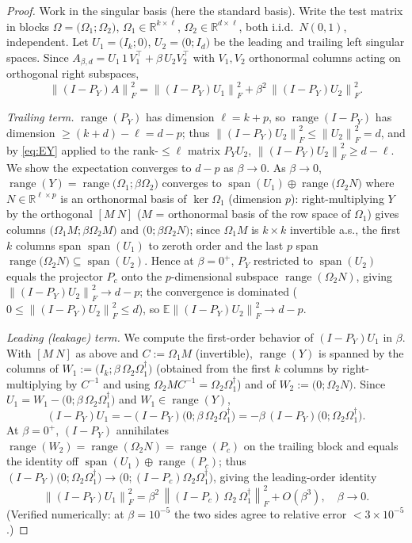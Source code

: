 \documentclass{amsart}
\theoremstyle{definition}
\DeclareMathOperator{\range}{range}
\DeclareMathOperator{\spann}{span}
\newcommand{\R}{\mathbb{R}}
\newcommand{\Frob}[1]{\left\lVert #1\right\rVert_F}
\newcommand{\E}{\mathbb{E}}
\begin{document}
\begin{proof}
Work in the singular basis (here the standard basis). Write the test matrix in
blocks $\Omega=\big(\Omega_1;\Omega_2\big)$, $\Omega_1\in\R^{k\times\ell}$,
$\Omega_2\in\R^{d\times\ell}$, both i.i.d.\ $N(0,1)$, independent. Let
$U_1=\big(I_k;0\big)$, $U_2=\big(0;I_d\big)$ be the leading and trailing left
singular spaces. Since $A_{\beta,d}=U_1\,1\,V_1^\top+\beta\,U_2 V_2^\top$ with
$V_1,V_2$ orthonormal columns acting on orthogonal right subspaces,
\begin{equation}\label{eq:decomp}
\Frob{(I-P_Y)A}^2=\Frob{(I-P_Y)U_1}^2+\beta^2\,\Frob{(I-P_Y)U_2}^2 .
\end{equation}

\emph{Trailing term.} $\range(P_Y)$ has dimension $\ell=k+p$, so $\range(I-P_Y)$
has dimension $\ge (k+d)-\ell=d-p$; thus
$\Frob{(I-P_Y)U_2}^2\le\Frob{U_2}^2=d$, and by \eqref{eq:EY}
applied to the rank-$\le\ell$ matrix $P_YU_2$,
$\Frob{(I-P_Y)U_2}^2\ge d-\ell$. We show the expectation converges to $d-p$ as
$\beta\to0$. As $\beta\to0$, $\range(Y)=\range\big(\Omega_1;\beta\Omega_2\big)$
converges to $\spann(U_1)\oplus\range\big(\Omega_2 N\big)$ where $N\in\R^{\ell\times p}$
is an orthonormal basis of $\ker\Omega_1$ (dimension $p$): right-multiplying
$Y$ by the orthogonal $[M\ N]$ ($M$ = orthonormal basis of the row space of
$\Omega_1$) gives columns $\big(\Omega_1 M;\beta\Omega_2 M\big)$ and
$\big(0;\beta\Omega_2 N\big)$; since $\Omega_1 M$ is $k\times k$ invertible a.s.,
the first $k$ columns span $\spann(U_1)$ to zeroth order and the last $p$ span
$\range\big(\Omega_2N\big)\subseteq\spann(U_2)$. Hence at $\beta=0^+$, $P_Y$
restricted to $\spann(U_2)$ equals the projector $P_c$ onto the $p$-dimensional
subspace $\range(\Omega_2N)$, giving $\Frob{(I-P_Y)U_2}^2\to d-p$; the
convergence is dominated ($0\le\Frob{(I-P_Y)U_2}^2\le d$), so
$\E\Frob{(I-P_Y)U_2}^2\to d-p$.

\emph{Leading (leakage) term.} We compute the first-order behavior of
$(I-P_Y)U_1$ in $\beta$. With $[M\ N]$ as above and $C:=\Omega_1M$ (invertible),
$\range(Y)$ is spanned by the columns of
$W_1:=\big(I_k;\beta\,\Omega_2\Omega_1^{\dagger}\big)$ (obtained from the first
$k$ columns by right-multiplying by $C^{-1}$ and using
$\Omega_2MC^{-1}=\Omega_2\Omega_1^{\dagger}$) and of
$W_2:=\big(0;\Omega_2N\big)$. Since $U_1=W_1-\big(0;\beta\,\Omega_2\Omega_1^{\dagger}\big)$
and $W_1\in\range(Y)$,
\[
(I-P_Y)U_1=-(I-P_Y)\big(0;\beta\,\Omega_2\Omega_1^{\dagger}\big)
=-\beta\,(I-P_Y)\big(0;\Omega_2\Omega_1^{\dagger}\big).
\]
At $\beta=0^+$, $(I-P_Y)$ annihilates $\range(W_2)=\range(\Omega_2N)=\range(P_c)$
on the trailing block and equals the identity off $\spann(U_1)\oplus\range(P_c)$;
thus
$(I-P_Y)\big(0;\Omega_2\Omega_1^{\dagger}\big)\to\big(0;(I-P_c)\Omega_2\Omega_1^{\dagger}\big)$,
giving the leading-order identity
\begin{equation}\label{eq:pert}
\Frob{(I-P_Y)U_1}^2=\beta^2\,\Frob{(I-P_c)\,\Omega_2\,\Omega_1^{\dagger}}^2
+O(\beta^3),\quad\beta\to0 .
\end{equation}
(Verified numerically: at $\beta=10^{-5}$ the two sides agree to relative error
$<3\times10^{-5}$.)


\end{proof}
\end{document}
